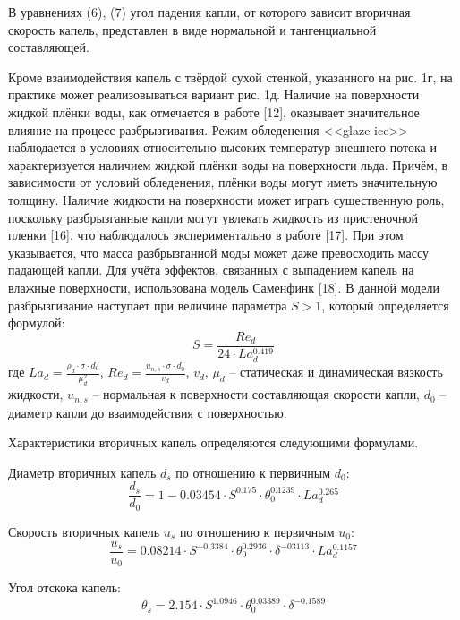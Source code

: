 \documentclass{psta}%
\begin{document}
В уравнениях (6), (7) угол падения капли, от которого зависит вторичная скорость капель, представлен в виде нормальной и тангенциальной составляющей.

Кроме взаимодействия капель с твёрдой сухой стенкой, указанного на рис. 1г, на практике может реализовываться вариант рис. 1д.
Наличие на поверхности жидкой плёнки воды, как отмечается в работе [12], оказывает значительное влияние на процесс разбрызгивания.
Режим обледенения <<glaze ice>> наблюдается в условиях относительно высоких температур внешнего потока и характеризуется наличием жидкой плёнки воды на поверхности льда.
Причём, в зависимости от условий обледенения, плёнки воды могут иметь значительную толщину.
Наличие жидкости на поверхности может играть существенную роль, поскольку разбрызганные капли могут увлекать жидкость из пристеночной пленки [16], что наблюдалось экспериментально в работе [17].
При этом указывается, что масса разбрызганной моды может даже превосходить массу падающей капли. Для учёта эффектов, связанных с выпадением капель на влажные поверхности, использована модель Саменфинк [18].
В данной модели разбрызгивание наступает при величине параметра $S > 1$, который определяется формулой:
\begin{equation*}
	S = \frac{Re_d}{24 \cdot La_d^{0.419}}
\end{equation*}
где $La_d = \frac{\rho_d \cdot \sigma \cdot d_0}{\mu_d^2}$, $Re_d = \frac{u_{n,s} \cdot \sigma \cdot d_0}{v_d}$, $v_d$, $\mu_d$ -- статическая и динамическая вязкость жидкости, $u_{n,s}$ -- нормальная к поверхности составляющая скорости капли, $d_0$ -- диаметр капли до взаимодействия с поверхностью.

Характеристики вторичных капель определяются следующими формулами.

Диаметр вторичных капель $d_s$ по отношению к первичным $d_0$:
\begin{equation*}
	\frac{d_s}{d_0} = 1 - 0.03454 \cdot S^{0.175} \cdot \theta_0^{0.1239} \cdot La_d^{0.265}
\end{equation*}

Скорость вторичных капель $u_s$ по отношению к первичным $u_0$:
\begin{equation*}
	\frac{u_s}{u_0} = 0.08214 \cdot S^{-0.3384} \cdot \theta_0^{0.2936} \cdot \delta^{-03113} \cdot La_d^{0.1157}
\end{equation*}

Угол отскока капель:
\begin{equation*}
	\theta_s = 2.154 \cdot S^{1.0946} \cdot \theta_0^{0.03389} \cdot \delta^{-0.1589}
\end{equation*}
\end{document}
